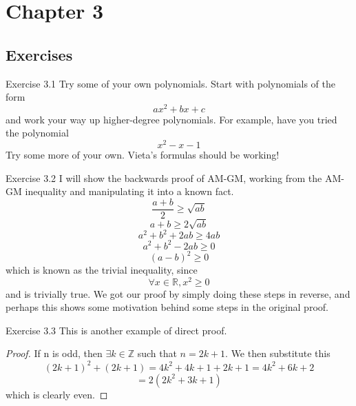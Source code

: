 \section{Chapter 3}
\subsection{Exercises}

\begin{sol}{Exercise 3.1}
Try some of your own polynomials. Start with polynomials of the form
\[
ax^2 + bx + c
\]
and work your way up higher-degree polynomials. For example, have you tried the polynomial
\[
x^2 -x - 1
\]
Try some more of your own. Vieta's formulas should be working!
\end{sol}

\begin{sol}{Exercise 3.2}
I will show the backwards proof of AM-GM, working from the AM-GM inequality and manipulating it into a known fact.
\[
\frac{a+b}{2} \geq \sqrt{ab}
\]
\[
a+b \geq 2\sqrt{ab}
\]
\[
a^2 + b^2 + 2ab \geq 4ab
\]
\[
a^2 + b^2 - 2ab \geq 0
\]
\[
(a-b)^2 \geq 0
\]
which is known as the trivial inequality, since
\[
\forall x \in \mathbb{R}, x^2 \geq 0
\]
and is trivially true. We got our proof by simply doing these steps in reverse, and perhaps this shows some motivation behind some steps in the original proof.
\end{sol}

\begin{sol}{Exercise 3.3}
This is another example of direct proof.
\begin{proof}
If n is odd, then $\exists k \in \mathbb{Z}$ such that $n = 2k + 1$. We then substitute this
\[
(2k+1)^2 + (2k+1) = 4k^2 + 4k + 1 + 2k + 1 = 4k^2 + 6k + 2
\]
\[
= 2(2k^2 + 3k + 1)
\]
which is clearly even.
\end{proof}
\end{sol}

